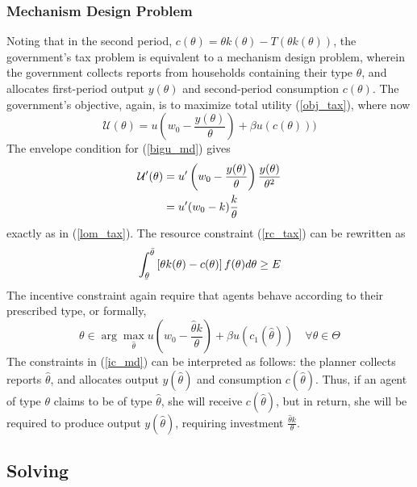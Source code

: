 \documentclass[11pt]{article}
\newcommand{\ubar}[1]{\underaccent{\bar}{#1}}
\newcommand{\p}{\prime}
\newcommand{\U}{\mathcal{U}}
\begin{document}
\subsubsection{Mechanism Design Problem} \label{md_prob}
Noting that in the second period, \( c(\theta) = \theta k(\theta) - T(\theta k(\theta))\), the government's tax problem is equivalent to a mechanism design problem, wherein the government collects reports from households containing their type \( \theta \), and allocates first-period output \( y(\theta) \) and second-period consumption \( c(\theta) \). The government's objective, again, is to maximize total utility (\ref{obj_tax}), where now 
\begin{equation}
    \U(\theta) = u\left( w_0 - \frac{y(\theta)}{\theta} \right) + \beta u(c(\theta))) \label{bigu_md}
\end{equation}
The envelope condition for (\ref{bigu_md}) gives 
\begin{align}
    \U^\p(\theta) &= u^\p\left( w_0 - \frac{y(\theta)}{\theta} \right)\frac{y(\theta)}{\theta^2} \notag \\
    &= u^\p(w_0 - k)\frac{k}{\theta} 
\end{align}
exactly as in (\ref{lom_tax}). The resource constraint (\ref{rc_tax}) can be rewritten as 
\begin{equation}
    \int_{\ubar{\theta}}^{\bar{\theta}} \left[ \theta k(\theta) - c(\theta) \right]f(\theta) d\theta \geq E \label{rc_md}
\end{equation}
The incentive constraint again require that agents behave according to their prescribed type, or formally,
\begin{equation}
    \theta \in \arg\max_{\hat{\theta}} u\left( w_0 - \frac{\hat{\theta} k}{\theta} \right) + \beta u(c_1(\hat{\theta}))\quad \forall \theta\in\Theta \label{ic_md}
\end{equation}
The constraints in (\ref{ic_md}) can be interpreted as follows: the planner collects reports \( \hat{\theta} \), and allocates output \( y(\hat{\theta}) \) and consumption \( c(\hat{\theta}) \). Thus, if an agent of type \( \theta \) claims to be of type \( \hat{\theta} \), she will receive \( c(\hat{\theta}) \), but in return, she will be required to produce output \( y(\hat{\theta}) \), requiring investment \( \frac{\hat{\theta}k}{\theta} \). 

\subsection{Solving}
\end{document}
